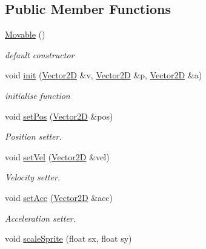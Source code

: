 \subsection*{Public Member Functions}
\begin{DoxyCompactItemize}
\item 
\hypertarget{class_movable_a053cf48796f1aef5b6f6cb4c6b22db78}{\hyperlink{class_movable_a053cf48796f1aef5b6f6cb4c6b22db78}{Movable} ()}\label{class_movable_a053cf48796f1aef5b6f6cb4c6b22db78}

\begin{DoxyCompactList}\small\item\em default constructor \end{DoxyCompactList}\item 
void \hyperlink{class_movable_ac7c594e41f6b95e70b0c851dfdf2738a}{init} (\hyperlink{class_vector2_d}{Vector2\-D} \&v, \hyperlink{class_vector2_d}{Vector2\-D} \&p, \hyperlink{class_vector2_d}{Vector2\-D} \&a)
\begin{DoxyCompactList}\small\item\em initialise function \end{DoxyCompactList}\item 
void \hyperlink{class_movable_a3d7bfc8850dade678649be4ebefd38ca}{set\-Pos} (\hyperlink{class_vector2_d}{Vector2\-D} \&pos)
\begin{DoxyCompactList}\small\item\em Position setter. \end{DoxyCompactList}\item 
void \hyperlink{class_movable_ad7eb0895f66e471a5348e1051efb0bc6}{set\-Vel} (\hyperlink{class_vector2_d}{Vector2\-D} \&vel)
\begin{DoxyCompactList}\small\item\em Velocity setter. \end{DoxyCompactList}\item 
void \hyperlink{class_movable_a01eca1584038ac6347b9dd7a5c4d14be}{set\-Acc} (\hyperlink{class_vector2_d}{Vector2\-D} \&acc)
\begin{DoxyCompactList}\small\item\em Acceleration setter. \end{DoxyCompactList}\item 
\hypertarget{class_movable_a62a255d120f31673e6a8021384bfa3ae}{void \hyperlink{class_movable_a62a255d120f31673e6a8021384bfa3ae}{scale\-Sprite} (float sx, float sy)}\label{class_movable_a62a255d120f31673e6a8021384bfa3ae}


\end{DoxyCompactItemize}
